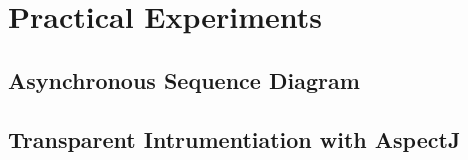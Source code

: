 
\chapter{Practical Experiments}
\label{ch:inpractice}

\section{Asynchronous Sequence Diagram}

\section{Transparent Intrumentiation with AspectJ}



